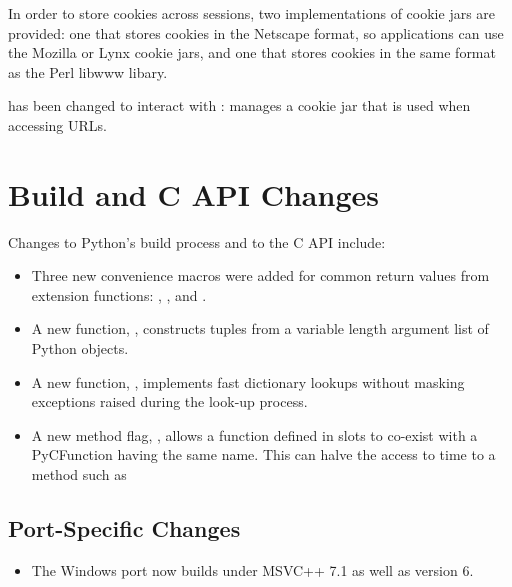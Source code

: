 \documentclass{howto}
\begin{document}
In order to store cookies across sessions, two implementations of
cookie jars are provided: one that stores cookies in the Netscape
format, so applications can use the Mozilla or Lynx cookie jars, and
one that stores cookies in the same format as the Perl libwww libary.

 has been changed to interact with :
 manages a cookie jar that is used when
accessing URLs.

\section{Build and C API Changes}

Changes to Python's build process and to the C API include:

\begin{itemize}

  \item Three new convenience macros were added for common return
  values from extension functions: ,
  , and .

  \item A new function, , constructs tuples from a variable
  length argument list of Python objects.

  \item A new function, ,
  implements fast dictionary lookups without masking exceptions raised
  during the look-up process.

  \item A new method flag, , allows a function
  defined in slots to co-exist with a PyCFunction having the same name.
  This can halve the access to time to a method such as

\end{itemize}


\subsection{Port-Specific Changes}

\begin{itemize}

\item The Windows port now builds under MSVC++ 7.1 as well as version 6.

\end{itemize}
\end{document}
